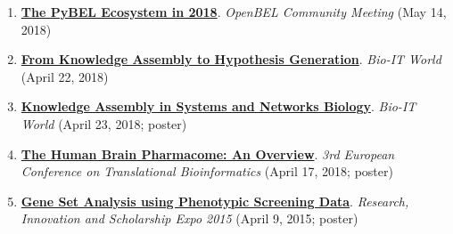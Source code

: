 \documentclass[10pt,a4paper,sans]{moderncv} %
\begin{document}
\begin{enumerate}
    \item \textbf{\href{https://docs.google.com/presentation/d/1Gsk8LxrVgrICproSgWZ3Gk4BXyOg-UwFlfzhVw5O0t8/edit?usp=sharing}{The PyBEL Ecosystem in 2018}}. \textit{OpenBEL Community Meeting} (May 14, 2018)

    \item \textbf{\href{https://docs.google.com/presentation/d/1_3j8H4f9pQ1m2ZQrF2QNfQNLh5SGqaodnl4AlaAST6w/edit?usp=sharing}{From Knowledge Assembly to Hypothesis Generation}}. \textit{Bio-IT World} (April 22, 2018)

    \item \textbf{\href{https://doi.org/10.6084/m9.figshare.6231701.v1}{Knowledge Assembly in Systems and Networks Biology}}. \textit{Bio-IT World} (April 23, 2018; poster)

    \item \textbf{\href{https://doi.org/10.6084/m9.figshare.6163775.v3}{The Human Brain Pharmacome: An Overview}}. \textit{3rd European Conference on Translational Bioinformatics} (April 17, 2018; poster)

    \item \textbf{\href{https://docs.google.com/presentation/d/1FU8lWGw6x4y9A_qB9rmxSaRRKiC0V3403EJETVGYMzk/edit?usp=sharing}{Gene Set Analysis using Phenotypic Screening Data}}. \textit{Research, Innovation and Scholarship Expo 2015} (April 9, 2015; poster)

\end{enumerate}
\end{document}
